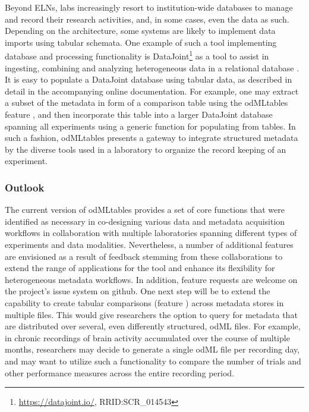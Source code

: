 {Beyond ELNs, labs increasingly resort to institution-wide databases to manage and record their research activities, and, in some cases, even the data as such. Depending on the architecture, some systems are likely to implement data imports using tabular schemata. One example of such a tool implementing database and processing functionality is DataJoint\footnote{\url{https://datajoint.io/}, RRID:SCR\_014543} as a tool to assist in ingesting, combining and analyzing heterogeneous data in a relational database \citep{Yatsenko_2015}. It is easy to populate a DataJoint database using tabular data, as described in detail in the accompanying online documentation. For example, one may extract a subset of the metadata in form of a comparison table using the odMLtables feature \fcompare, and then incorporate this table into a larger DataJoint database spanning all experiments using a generic function for populating from  tables. In such a fashion, odMLtables presents a gateway to integrate structured metadata by the diverse tools used in a laboratory to organize the record keeping of an experiment.

\subsubsection{Outlook}
The current version of odMLtables provides a set of core functions that were identified as necessary in co-designing various data and metadata acquisition workflows in collaboration with multiple laboratories spanning different types of experiments and data modalities. Nevertheless, a number of additional features are envisioned as a result of feedback stemming from these collaborations to extend the range of applications for the tool and enhance its flexibility for heterogeneous metadata workflows. In addition, feature requests are welcome on the project's issue system on github. One next step will be to extend the capability to create tabular comparisons (feature \fcompare) across metadata stores in multiple files. This would give researchers the option to query for metadata that are distributed over several, even differently structured, odML files. For example, in chronic recordings of brain activity accumulated over the course of multiple months, researchers may decide to generate a single odML file per recording day, and may want to utilize such a functionality to compare the number of trials and other performance measures across the entire recording period.

}
